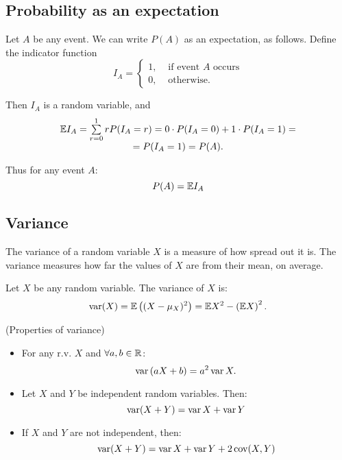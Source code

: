\subsection*{Probability as an expectation}
\par 
Let $A$ be any event. We can write $P(A)$ as an expectation, as follows. Define the indicator function 
\[
    I_A = \left\{
        \begin{array}{ll}
            1, & \text{ if event } A \text{ occurs} \\
            0, & \text{ otherwise.}
        \end{array}
     \right.  
\]
\par 
Then $I_A$ is a random variable, and 
\[
    \begin{array}{c}
        \mathbb{E} I_A = \sum\limits_{r=0}^1 rP(I_A = r) = 0 \cdot P(I_A=0) + 1 \cdot P(I_A = 1) = \\ = P(I_A = 1) = P(A).        
    \end{array}
\]
\par 
Thus for any event $A$:
\[
        P(A) = \mathbb{E} I_A
\]
\subsection*{Variance}
\par 
The variance of a random variable $X$ is a measure of how spread out it is. The variance measures how far the values of $X$ are from their mean, on average.
\begin{definition}{}{}
    Let $X$ be any random variable. The variance of $X$ is:
    \[
        \operatorname{var} (X) = \mathbb{E}\left((X-\mu_X)^2\right) = \mathbb{E} X^2 - \left(\mathbb{E} X\right)^2.  
    \]
\end{definition}
 
\begin{theorema}{(Properties of variance)}{}
    \begin{itemize}
        \item For any r.v. $X$ and $\forall a, b \in \mathbb{R}$:
        \[
            \operatorname{var} \left(a X + b\right) = a^2 \operatorname{var} X.  
        \]
        \item Let $X$ and $Y$ be independent random variables. Then:
        \[
            \operatorname{var} (X+Y) = \operatorname{var} X + \operatorname{var} Y  
        \]
        \item If $X$ and $Y$ are not independent, then:
        \[
            \operatorname{var} (X+Y) = \operatorname{var} X + \operatorname{var} Y + 2\operatorname{cov} (X,Y)  
        \]
    \end{itemize}
\end{theorema}